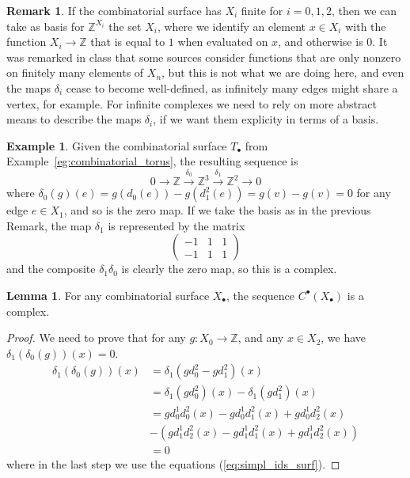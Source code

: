 \documentclass{tufte-handout}
\def\ZZ{\mathbb{Z}}
\theoremstyle{definition}
\newtheorem{lemma}{Lemma}
\newtheorem{example}{Example}
\newtheorem*{rem}{Remark}
\begin{document}
\begin{rem}\label{rem:basis_finite_complex}
If the combinatorial surface has $X_i$ finite for $i=0,1,2$, then we can 
take as basis for $\ZZ^{X_i}$ the set $X_i$, where we identify an element $x\in X_i$ with 
the function $X_i\to \ZZ$ that is equal to $1$ when evaluated on $x$, and otherwise is $0$.
It was remarked in class that some sources consider functions that are only nonzero on 
finitely many elements of $X_n$, but this is not what we are doing here, and even the maps
$\delta_i$ cease to become well-defined, as infinitely many edges might share a vertex, for 
example. For infinite complexes we need to rely on more abstract means to describe the maps $\delta_i$,
 if we want them explicity in terms of a basis. 
\end{rem}

\begin{example}
Given the combinatorial surface $T_\bullet$ from Example~\ref{eg:combinatorial_torus}, the 
resulting sequence is 
\[
	0 \to \ZZ \xrightarrow{\delta_0} \ZZ^3 \xrightarrow{\delta_1} \ZZ^2 \to 0
\]
where $\delta_0(g)(e) = g(d_0(e)) - g(d^2_1(e)) = g(v) - g(v) = 0$ for any edge $e\in X_1$, 
and so is the zero map. If we take the basis as in the previous
Remark, the map $\delta_1$ is represented by the matrix
\[
	\begin{pmatrix}
	-1&1&1 \\
	-1&1&1
	\end{pmatrix}
\] 
and the composite $\delta_1\delta_0$ is clearly the zero map, so this is a complex.
\end{example}

\begin{lemma}
For any combinatorial surface $X_\bullet$, the sequence $C^\bullet(X_\bullet)$ is a complex.
\end{lemma}

\begin{proof}
We need to prove that for any $g\colon X_0\to \ZZ$, and any $x\in X_2$, we have
$\delta_1(\delta_0(g))(x) = 0$.
\begin{align*}
\delta_1(\delta_0(g))(x) & = \delta_1(g d^2_0 - gd^2_1)(x)\\
			 & = \delta_1(gd^2_0)(x) - \delta_1(gd^2_1)(x)\\
			 & = gd^1_0d^2_0(x) - gd^1_0d^2_1(x) + gd^1_0d^2_2(x) \\
			 & - (gd^1_1d^2_2(x) - gd^1_1d^2_1(x) + gd^1_1d^2_2(x))\\
			 & = 0 
\end{align*}
where in the last step we use the equations (\ref{eq:simpl_ids_surf}).
\end{proof}
\end{document}
